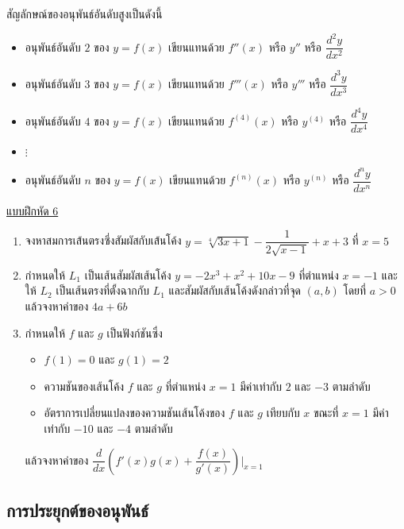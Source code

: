 \documentclass[hidelinks,12pt,a4paper]{article}
\makeatletter
\newcommand{\s}{\space}
\newcommand{\nr}[2]{\sqrt[#1]{#2}}
\newcommand{\ddx}{\dfrac{d}{dx}}
\newcommand{\Jitem}{%
  \refstepcounter{\@enumctr}%
  \item[%
    {\raisebox{-0ex}[0pt][0pt]{$\boldsymbol{\textcolor{magenta}{\mathbf{J}}^{\color{blue}{p}}}$}}%
    \,%
    \@nameuse{label\@enumctr}]%
}
\makeatother
\begin{document}
สัญลักษณ์ของอนุพันธ์อันดับสูงเป็นดังนี้
\begin{itemize}
    \item อนุพันธ์อันดับ $2$ ของ $y=f(x)$ \s เขียนแทนด้วย $f''(x)$ หรือ $y''$ หรือ $\dfrac{d^2y}{dx^2}$
    \item อนุพันธ์อันดับ $3$ ของ $y=f(x)$ \s เขียนแทนด้วย $f'''(x)$ หรือ $y'''$ หรือ $\dfrac{d^3y}{dx^3}$
    \item อนุพันธ์อันดับ $4$ ของ $y=f(x)$ \s เขียนแทนด้วย $f^{(4)}(x)$ หรือ $y^{(4)}$ หรือ $\dfrac{d^4y}{dx^4}$
    \item[\empty]\hspace{20.5mm} $\vdots$
    \item อนุพันธ์อันดับ $n$ ของ $y=f(x)$ \s เขียนแทนด้วย $f^{(n)}(x)$ หรือ $y^{(n)}$ หรือ $\dfrac{d^ny}{dx^n}$
\end{itemize}
\newpage
\underline{\large แบบฝึกหัด 6} 
\begin{enumerate}
    \item จงหาสมการเส้นตรงซึ่งสัมผัสกับเส้นโค้ง $y=\nr{4}{3x+1}-\dfrac{1}{2\sqrt{x-1}}+x+3$ \s ที่ $x=5$
    \vspace{50mm}
    \Jitem กำหนดให้ $L_1$ เป็นเส้นสัมผัสเส้นโค้ง $y=-2x^3+x^2+10x-9$ ที่ตำแหน่ง $x=-1$ \s และให้ $L_2$ เป็นเส้นตรงที่ตั้งฉากกับ $L_1$ และสัมผัสกับเส้นโค้งดังกล่าวที่จุด $(a,b)$ โดยที่ $a>0$ \s แล้วจงหาค่าของ \s $4a+6b$
    \vspace{60mm}
    \item กำหนดให้ $f$ และ $g$ เป็นฟังก์ชันซึ่ง 
    \begin{itemize}
        \item $f(1)=0$ และ $g(1)=2$
        \item ความชันของเส้นโค้ง $f$ และ $g$ ที่ตำแหน่ง $x=1$ มีค่าเท่ากับ $2$ และ $-3$ ตามลำดับ
        \item อัตราการเปลี่ยนแปลงของความชันเส้นโค้งของ $f$ และ $g$ เทียบกับ $x$ ขณะที่ $x=1$ มีค่าเท่ากับ $-10$ และ $-4$ ตามลำดับ
    \end{itemize}
    แล้วจงหาค่าของ \s $\ddx\left(f'(x)g(x)+\dfrac{f(x)}{g'(x)}\right)\bigg|_{x=1}$
\end{enumerate}
\newpage
\subsection{การประยุกต์ของอนุพันธ์}
\end{document}
